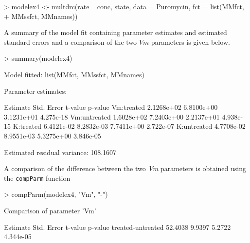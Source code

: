 \documentclass[a4paper]{article}
\begin{document}
\begin{Schunk}
\begin{Sinput}
> modelex4 <- multdrc(rate ~ conc, state, data = Puromycin, fct = list(MMfct, 
+     MMssfct, MMnames))
\end{Sinput}
\end{Schunk}
A summary of the model fit containing parameter estimates and estimated standard errors and a comparison of the two $Vm$ parameters is given below.

\begin{Schunk}
\begin{Sinput}
> summary(modelex4)
\end{Sinput}
\begin{Soutput}
Model fitted: list(MMfct, MMssfct, MMnames)

Parameter estimates:

               Estimate Std. Error    t-value   p-value
Vm:treated   2.1268e+02 6.8100e+00 3.1231e+01 4.275e-18
Vm:untreated 1.6028e+02 7.2403e+00 2.2137e+01 4.938e-15
K:treated    6.4121e-02 8.2832e-03 7.7411e+00 2.722e-07
K:untreated  4.7708e-02 8.9551e-03 5.3275e+00 3.846e-05

Estimated residual variance: 108.1607 
\end{Soutput}
\end{Schunk}
A comparison of the difference between the two \emph{Vm} parameters is obtained using the \verb+compParm+ function
\begin{Schunk}
\begin{Sinput}
> compParm(modelex4, "Vm", "-")
\end{Sinput}
\begin{Soutput}
Comparison of parameter 'Vm' 

                  Estimate Std. Error t-value   p-value
treated-untreated  52.4038     9.9397  5.2722 4.344e-05
\end{Soutput}
\end{Schunk}



\end{document}

